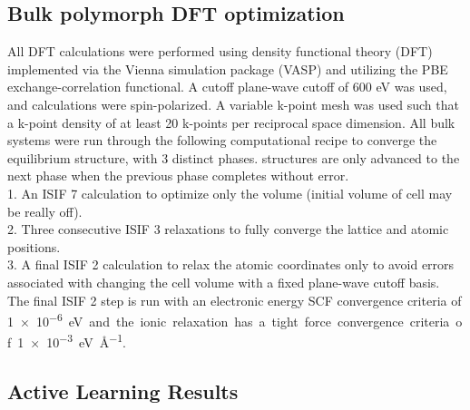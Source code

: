 

\subsection{Bulk polymorph DFT optimization}  %


%
%
All DFT calculations were performed using density functional theory (DFT) implemented via the Vienna  simulation package (VASP) \cite{Kresse1995,Kresse1996_0,Kresse1996_1} and utilizing the PBE exchange-correlation functional\cite{Perdew1996}.
%
A cutoff plane-wave cutoff of 600 eV was used, and calculations were spin-polarized.
%
A variable k-point mesh was used such that a k-point density of at least \num{20} k-points per reciprocal space dimension.
%
All bulk systems were run through the following computational recipe to converge the equilibrium structure, with \num{3} distinct phases.
%
structures are only advanced to the next phase when the previous phase completes without error.
\\
1. An ISIF \num{7} calculation to optimize only the volume (initial volume of cell may be really off).
\\
2. Three consecutive ISIF \num{3} relaxations to fully converge the lattice and atomic positions.
\\
3. A final ISIF \num{2} calculation to relax the atomic coordinates only to avoid errors associated with changing the cell volume with a fixed plane-wave cutoff basis.
\\
The final ISIF \num{2} step is run with an electronic energy SCF convergence criteria of \SI{1e-6} eV and the ionic relaxation has a tight force convergence criteria of \SI{1e-3}{\electronvolt\per\angstrom}.




\subsection{\IrOtwo Active Learning Results} %


